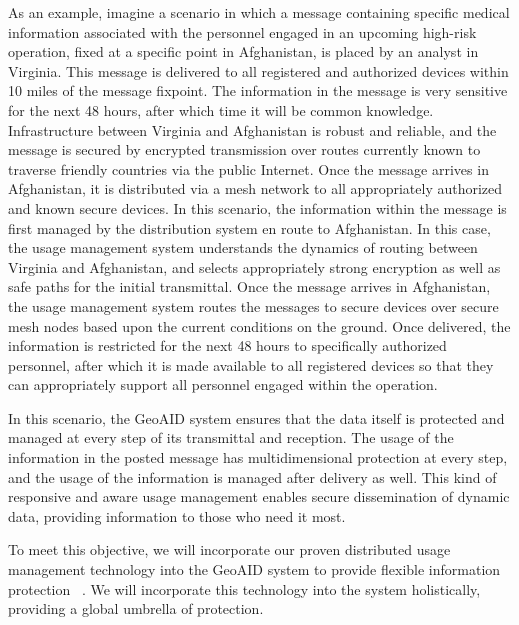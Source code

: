 \documentclass{sbir}
\begin{document}
As an example, imagine a scenario in which a message containing specific medical information associated with the personnel engaged in an upcoming high-risk operation, fixed at a specific point in Afghanistan, is placed by an analyst in Virginia. This message is delivered to all registered and authorized devices within 10 miles of the message fixpoint. The information in the message is very sensitive for the next 48 hours, after which time it will be common knowledge. Infrastructure between Virginia and Afghanistan is robust and reliable, and the message is secured by encrypted transmission over routes currently known to traverse friendly countries via the public Internet. Once the message arrives in Afghanistan, it is distributed via a mesh network to all appropriately authorized and known secure devices. In this scenario, the information within the message is first managed by the distribution system en route to Afghanistan. In this case, the usage management system understands the dynamics of routing between Virginia and Afghanistan, and selects appropriately strong encryption as well as safe paths for the initial transmittal. Once the message arrives in Afghanistan, the usage management system routes the messages to secure devices over secure mesh nodes based upon the current conditions on the ground. Once delivered, the information is restricted for the next 48 hours to specifically authorized personnel, after which it is made available to all registered devices so that they can appropriately support all personnel engaged within the operation.

In this scenario, the GeoAID system ensures that the data itself is protected and managed at every step of its transmittal and reception. The usage of the information in the posted message has multidimensional protection at every step, and the usage of the information is managed after delivery as well. This kind of responsive and aware usage management enables secure dissemination of dynamic data, providing information to those who need it most.

To meet this objective, we will incorporate our proven distributed usage management technology into the GeoAID system to provide flexible information protection~\cite{HeHeShGiJa:11,JaHeLa:10,JaLaHe:11} . We will incorporate this technology into the system holistically, providing a global umbrella of protection.

\end{document}
